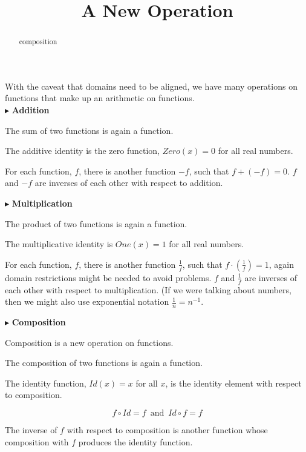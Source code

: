 \documentclass{ximera}
\title{A New Operation}
\begin{document}
\begin{abstract}
composition
\end{abstract}
\maketitle





With the caveat that domains need to be aligned, we have many operations on functions that make up an arithmetic on functions. \\




$\blacktriangleright$ \textbf{\textcolor{blue!75!black}{Addition}}  

The sum of two functions is again a function. 

The additive identity is the zero function, $Zero(x) = 0$ for all real numbers.

For each function, $f$, there is another function $-f$, such that $f + (-f) = 0$.   $f$ and $-f$ are inverses of each other with respect to addition.




$\blacktriangleright$ \textbf{\textcolor{blue!75!black}{Multiplication}} 

The product of two functions is again a function.  

The multiplicative identity is $One(x) = 1$ for all real numbers.

For each function, $f$, there is another function $\frac{1}{f}$, such that $f \cdot \left( \frac{1}{f} \right) = 1$, again domain restrictions might be needed to avoid problems.   $f$ and $\frac{1}{f}$ are inverses of each other with respect to multiplication.  (If we were talking about numbers, then we might also use exponential notation $\frac{1}{n} = n^{-1}$.


$\blacktriangleright$ \textbf{\textcolor{blue!75!black}{Composition}} 

Composition is a new operation on functions.

The composition of two functions is again a function. 

The identity function, $Id(x) = x$ for all $x$, is the identity element with respect to composition.



\[   f \circ Id = f    \, \text{ and } \, Id \circ f = f        \]



The inverse of $f$ with respect to composition is another function whose composition with $f$ produces the identity function.
\end{document}
